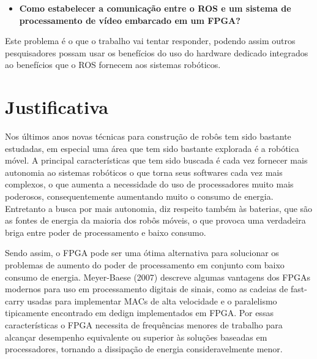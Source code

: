 \begin{itemize}
    \item \textbf{Como estabelecer a comunicação entre o ROS e um sistema de processamento de vídeo 
embarcado em um FPGA?}

\end{itemize}

Este problema é o que o trabalho vai tentar responder, podendo assim outros pesquisadores possam usar 
os benefícios do uso do hardware dedicado integrados ao benefícios que o ROS fornecem aos sistemas 
robóticos.





  







\section{Justificativa}

Nos últimos anos novas técnicas para construção de robôs tem sido bastante estudadas, em 
especial uma área que tem sido bastante explorada é a robótica móvel. A principal 
características que tem sido buscada é cada vez fornecer mais autonomia ao sistemas 
robóticos o que torna seus softwares cada vez mais complexos, o que aumenta a 
necessidade do uso de processadores muito mais poderosos, consequentemente aumentando
muito o consumo de energia. Entretanto a busca por mais autonomia, diz respeito também às 
baterias, que são as fontes de energia da maioria dos robôs móveis, o que provoca uma 
verdadeira briga entre poder de processamento e baixo consumo.

Sendo assim, o FPGA pode ser uma ótima alternativa para solucionar os problemas de aumento 
do poder de processamento em conjunto com baixo consumo de energia. Meyer-Baese (2007) 
descreve algumas vantagens dos FPGAs modernos para uso em processamento digitais de 
sinais, como as cadeias de fast-carry usadas para implementar MACs de alta velocidade e o 
paralelismo tipicamente encontrado em dedign implementados em FPGA. Por essas 
características o FPGA necessita de frequências menores de trabalho para alcançar 
desempenho equivalente ou superior às soluções baseadas em processadores, tornando a 
dissipação de energia consideravelmente menor.

